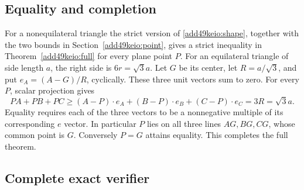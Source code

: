 \documentclass[11pt,a4paper]{article}
\numberwithin{equation}{section}
\theoremstyle{definition}
\theoremstyle{remark}
\begin{document}
\subsection{Equality and completion}

For a nonequilateral triangle the strict version of \eqref{add49keio:shape},
together with the two bounds in Section~\ref{add49keio:point}, gives a strict inequality
in Theorem~\ref{add49keio:full} for every plane point $P$.
For an equilateral triangle of side length $a$, the right side is
$6r=\sqrt3a$. Let $G$ be its center, let $R=a/\sqrt3$, and put
$e_A=(A-G)/R$, cyclically. These three unit vectors sum to zero.
For every $P$, scalar projection gives
\[
 PA+PB+PC\ge
 (A-P)\mathbin{\cdot}e_A+(B-P)\mathbin{\cdot}e_B
 +(C-P)\mathbin{\cdot}e_C=3R=\sqrt3a.
\]
Equality requires each of the three vectors to be a nonnegative
multiple of its corresponding $e$ vector. In particular $P$ lies on
all three lines $AG,BG,CG$, whose common point is $G$.
Conversely $P=G$ attains equality. This completes the full theorem.

\subsection{Complete exact verifier}
\end{document}
